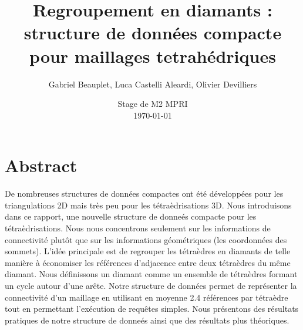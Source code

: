 \documentclass[a4paper,11pt,openany]{article}
\title{Regroupement en diamants : structure de données compacte pour maillages tetrahédriques}
\author{Gabriel Beauplet, Luca Castelli Aleardi, Olivier Devilliers}
\date{%
    Stage de M2 MPRI\\%
    \today
}
\begin{document}
\maketitle

\section{Abstract}
\noindent
De nombreuses structures de données compactes ont été développées pour les triangulations 2D mais très peu pour les tétraèdrisations 3D. Nous introduisons dans ce rapport, une nouvelle structure de donneés compacte pour les tétraèdrisations. Nous nous concentrons seulement sur les informations de connectivité plutôt que sur les informations géométriques (les coordonnées des sommets). L'idée principale est de regrouper les tétraèdres en diamants de telle manière à économiser les références d'adjacence entre deux tétraèdres du même diamant. Nous définissons un diamant comme un ensemble de tétraèdres formant un cycle autour d'une arête. Notre structure de données permet de représenter la connectivité d'un maillage en utilisant en moyenne 2.4 références par tétraèdre tout en permettant l'exécution de requêtes simples. Nous présentons des résultats pratiques de notre structure de donneés ainsi que des résultats plus théoriques.
\end{document}
